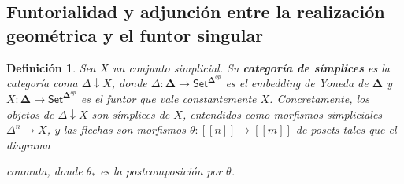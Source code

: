 \documentclass[11pt]{report}
\theoremstyle{colored}
\newtheorem{definition}{Definición}[section]
\newcommand{\nat}[1]{[\![#1]\!]}
\newcommand{\ord}[1]{\nat{#1}}
\newcommand{\cat}[1]{\mathsf{#1}}
\renewcommand{\ss}[1]{\Delta^{#1}}
\newcommand{\ordcat}{\boldsymbol{\Delta}}
\begin{document}
\subsection{Funtorialidad y adjunción entre la realización geométrica y el funtor singular}

\begin{definition} Sea $X$ un conjunto simplicial. Su \textbf{categoría de símplices} es la categoría coma $\Delta \downarrow X$, donde $\Delta: \ordcat \to \cat{Set}^{\ordcat^{op}}$ es el embedding de Yoneda de $\ordcat$ y $X : \ordcat \to \cat{Set}^{\ordcat^{op}}$ es el funtor que vale constantemente $X$. Concretamente, los objetos de $\Delta \downarrow X$ son \textit{símplices} de $X$, entendidos como morfismos simpliciales $\ss{n} \to X$, y las flechas son morfismos $\theta : \ord{n} \to \ord{m}$ de posets tales que el diagrama
\begin{center}
\end{center}
conmuta, donde $\theta_*$ es la postcomposición por $\theta$.
\end{definition}
\end{document}
